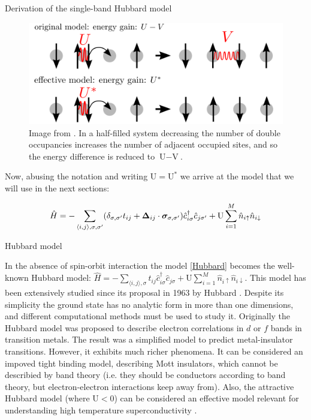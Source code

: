 \begin{section}{Derivation of the single-band Hubbard model}
\begin{figure}
\centering
  \includegraphics[width=0.5\linewidth]{../Figures/non_local_coulomb.png}
  \caption{Image from \cite{Schuler2013}. In a half-filled system decreasing the number of double occupancies increases the number of adjacent occupied sites, and so the energy difference is reduced to $\text{U}-\text{V}$.} 
\label{Fig2.1}
\end{figure}

Now, abusing the notation and writing $\text{U} = \text{U}^*$ we arrive at the model that we will use in the next sections:

\begin{equation}
\label{Hubbard}
\hat{H} = -\sum_{\langle i,j \rangle, \sigma, \sigma'}(\delta_{\sigma, \sigma'} t_{ij} + \boldsymbol{\Delta}_{ij} \cdot \boldsymbol{\sigma}_{\sigma, \sigma'})\hat{c}_{i \sigma}^\dagger \hat{c}_{j \sigma'} + \text{U} \sum_{i=1}^M \hat{n}_{i\uparrow}\hat{n}_{i\downarrow}
\end{equation}

\begin{subsection}{Hubbard model}

In the absence of spin-orbit interaction the model \ref{Hubbard} becomes the well-known Hubbard model: $\hat{H} = -\sum_{\langle i,j \rangle, \sigma} t_{ij} \hat{c}_{i \sigma}^\dagger \hat{c}_{j \sigma} + \text{U} \sum_{i=1}^M \hat{n}_{i\uparrow}\hat{n}_{i\downarrow}$. This model has been extensively studied since its proposal in 1963 by Hubbard \cite{Hubbard1963}. Despite its simplicity the ground state has no analytic form in more than one dimensions, and different computational methods must be used to study it. Originally the Hubbard model was proposed to describe electron correlations in $d$ or $f$ bands in transition metals. The result was a simplified model to predict metal-insulator transitions. However, it exhibits much richer phenomena. It can be considered an impoved tight binding model, describing Mott insulators, which cannot be describied by band theory (i.e. they should be conductors according to band theory, but electron-electron interactions keep away from). Also, the attractive Hubbard model (where $\text{U} < 0$) can be considered an effective model relevant for understanding high temperature superconductivity \cite{Alexandrov1981}.

\end{subsection}

\end{section}

